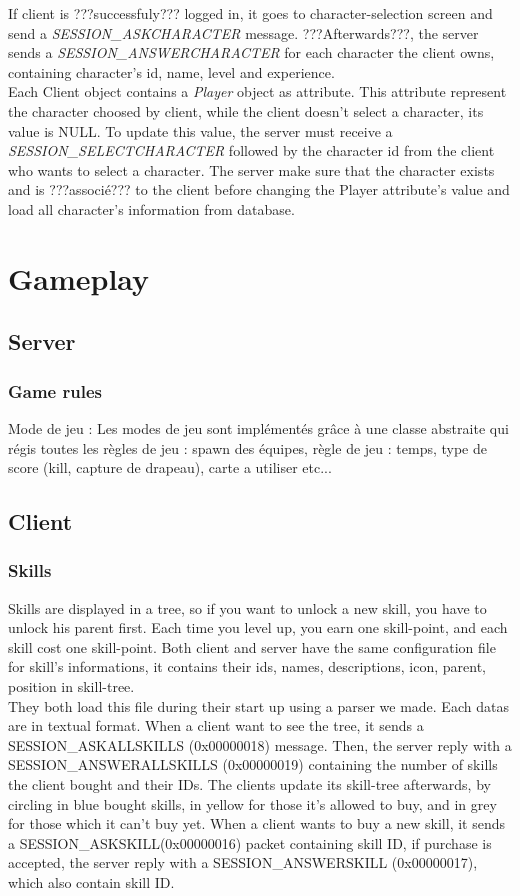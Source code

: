 \documentclass{scrreprt}
\begin{document}
			If client is ???successfuly??? logged in, it goes to character-selection screen and send a \emph{SESSION\_ASKCHARACTER} message. ???Afterwards???, the server sends a \emph{SESSION\_ANSWERCHARACTER} for each character the client owns, containing character's id, name, level and experience.\\
				Each Client object contains a \emph{Player} object as attribute. This attribute represent the character choosed by client, while the client doesn't select a character, its value is NULL. To update this value, the server must receive a \emph{SESSION\_SELECTCHARACTER} followed by the character id from the client who wants to select a character. The server make sure that the character exists and is ???associé??? to the client before changing the Player attribute's value and load all character's information from database.



				\section{Gameplay}
				\subsection{Server}
				\subsubsection{Game rules}
				Mode de jeu :
				Les modes de jeu sont implémentés grâce à une classe abstraite qui régis toutes les règles de jeu : spawn des équipes, règle de jeu : temps, type de score (kill, capture de drapeau), carte a utiliser etc...
				\subsection{Client}
				\subsubsection{Skills}
				Skills are displayed in a tree, so if you want to unlock a new skill, you have to unlock his parent first. Each time you level up, you earn one skill-point, and each skill cost one skill-point. Both client and server have the same configuration file for skill's informations, it contains their ids, names, descriptions, icon, parent, position in skill-tree.\\

				They both load this file during their start up using a parser we made. Each datas are in textual format. When a client want to see the tree, it sends a SESSION\_ASKALLSKILLS (0x00000018) message. Then, the server reply with a SESSION\_ANSWERALLSKILLS (0x00000019) containing the number of skills the client bought and their IDs. The clients update its skill-tree afterwards, by circling in blue bought skills, in yellow for those it's allowed to buy, and in grey for those which it can't buy yet.
				When a client wants to buy a new skill, it sends a SESSION\_ASKSKILL(0x00000016) packet containing skill ID, if purchase is accepted, the server reply with a SESSION\_ANSWERSKILL (0x00000017), which also contain skill ID.\\
\end{document}
